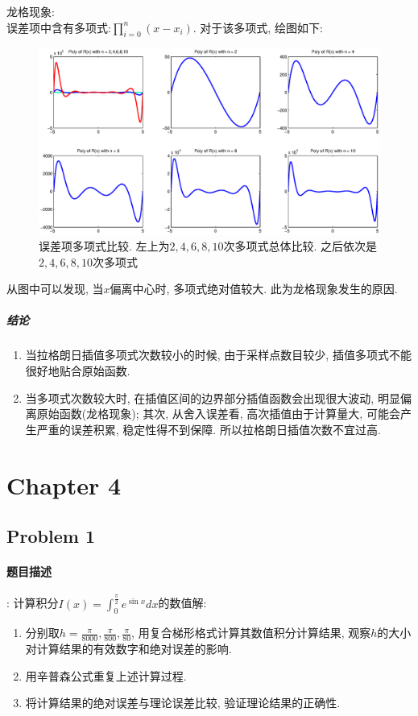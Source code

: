 \documentclass{article}
\begin{document}
\begin{CJK*}{UTF8}{song}
 				龙格现象:\\
 				误差项中含有多项式:$\prod_{i=0}^{n}\left(x-x_i\right) $. 对于该多项式, 绘图如下:
 				\begin{figure}[H]
 					\centering
 					\includegraphics[width=1.0\textwidth]{../chapter3_1_lunge.eps}
 					\caption{误差项多项式比较. 左上为$2,4,6,8,10$次多项式总体比较. 之后依次是$2,4,6,8,10$次多项式}
 					\label{img_chapter3_1_lunge}
 				\end{figure}
 				从图中可以发现, 当$x$偏离中心时, 多项式绝对值较大. 此为龙格现象发生的原因.
 				\subparagraph{结论}
 				\begin{enumerate}
 					\item 当拉格朗日插值多项式次数较小的时候, 由于采样点数目较少, 插值多项式不能很好地贴合原始函数.
 					\item 当多项式次数较大时, 在插值区间的边界部分插值函数会出现很大波动, 明显偏离原始函数(龙格现象); 其次, 从舍入误差看, 高次插值由于计算量大, 可能会产生严重的误差积累, 稳定性得不到保障. 所以拉格朗日插值次数不宜过高.
 				\end{enumerate}

	\section{Chapter 4}
		\subsection{Problem 1}
			\paragraph{题目描述}
			:\newline
			计算积分$I\left(x\right) = \int_{0}^{\frac{\pi}{2}} e^{\sin x}dx$的数值解:
			\begin{enumerate}
				\item 分别取$h=\frac{\pi}{8000}, \frac{\pi}{800}, \frac{\pi}{80}$, 用复合梯形格式计算其数值积分计算结果, 观察$h$的大小对计算结果的有效数字和绝对误差的影响.
				\item 用辛普森公式重复上述计算过程.
				\item 将计算结果的绝对误差与理论误差比较, 验证理论结果的正确性.
			\end{enumerate}
		

\end{CJK*}
\end{document}
